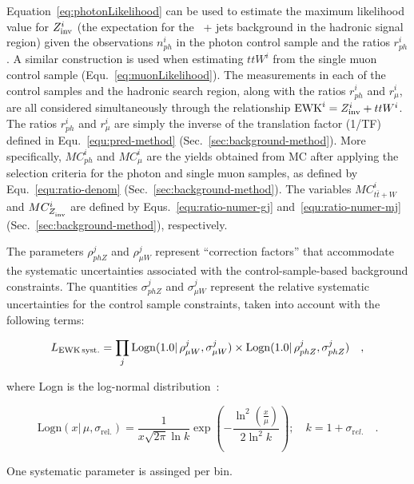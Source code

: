 Equation~\ref{eq:photonLikelihood} can be used to estimate the maximum
likelihood value for $Z_{\rm inv}^{i}$ (the expectation for the \znunu\ +
jets background in the hadronic signal region) given the observations
$n_{ph}^i$ in the photon control sample and the ratios $r_{ph}^i$. A
similar construction is used when estimating $ttW^{i}$ from the single 
muon control sample (Equ.~\ref{eq:muonLikelihood}). The measurements in 
each of the control samples and the hadronic search region, along with 
the ratios $r_{ph}^{i}$ and $r_{\mu}^{i}$, are all considered
simultaneously through the relationship $\mathrm{EWK}^i =  Z_{\rm inv}^{i} + ttW^{i}$.
The ratios $r_{ph}^{i}$ and $r_{\mu}^{i}$ are simply 
the inverse of the translation factor (1/TF) defined in 
Equ.~\ref{equ:pred-method} (Sec.~\ref{sec:background-method}). More 
specifically, $MC_{ph}^i$ and $MC_{\mu}^i$ are the yields obtained from MC
after applying the selection criteria for the photon and single muon samples, 
as defined by Equ.~\ref{equ:ratio-denom} (Sec.~\ref{sec:background-method}). 
The variables $MC_{t\bar{t}+W}^i$ and $MC_{Z_{\rm inv}^{}}^i$ are defined by 
Equs.~\ref{equ:ratio-numer-gj} and~\ref{equ:ratio-numer-mj} 
(Sec.~\ref{sec:background-method}), respectively.

The parameters $\rho_{phZ}^j$ and $\rho_{\mu
  W}^j$ represent ``correction factors'' that accommodate the
systematic uncertainties associated with the control-sample-based
background constraints.  The quantities $\sigma_{phZ}^j$
and $\sigma_{\mu W}^j$ represent the relative
systematic uncertainties for the control sample constraints, taken
into account with the following terms:

\begin{equation}
\label{eq:ewkSyst}
L_{\rm EWK\, syst.}=\prod_j \mathrm{Logn}( 1.0 |\,\rho_{\mu W}^j,
\sigma_{\mu W}^j)\times \mathrm{Logn}( 1.0 |\,\rho_{ph Z}^j,
\sigma_{phZ}^j) \quad ,
\end{equation}

where Logn is the log-normal
distribution~\cite{cousins-log-normal}:

\begin{equation}
\label{eq:log-normal}
\mathrm{Logn}(x |\,\mu,\sigma_{\mathrm{rel.}}) =
\frac{1}{x\sqrt{2\pi}\ln{k}}\exp{\left(-\frac{\ln^2{\left(\frac{x}{\mu}\right)}}{2\ln^2{k}}\right)};\quad
k=1+\sigma_{\mathrm rel.}\quad. 
\end{equation}

One systematic parameter is assinged per \HT bin.

